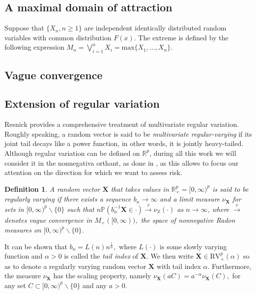 \documentclass[11pt, oneside]{book}
\theoremstyle{plain}
\newtheorem{defn}{Definition}[section]
\theoremstyle{remark}
\begin{document}
\subsection*{A maximal domain of attraction}
Suppose that $\{X_n, n\geq 1\}$ are independent identically distributed random
variables with common distribution $F(x)$. The extreme is defined by the
following expression $M_n = \bigvee_{i=1}^n X_i = \text{max}\{X_1,\dots,X_n\}.$


\subsection*{Vague convergence}

\subsection{Extension of regular variation}
Resnick \cite{resnick2007} provides a comprehensive treatment of multivariate
regular variation. Roughly speaking, a random vector is said to be
\emph{multivariate regular-varying} if its joint tail decays like a power
function, in other words, it is jointly heavy-tailed. Although regular variation
can be defined on $\mathbb{R}^p$, during all this work we will consider it in
the nonnegativa orthant, as done in \cite{cooley-thibaud}, as this allows to
focus our attention on the direction for which we want to assess risk. 
\begin{defn}
    A random vector $\mathbf{X}$ that takes values in $\mathbb{R}^p_+ =
    [0,\infty)^p$ is said to be regularly varying if there exists a sequence
    $b_n\to\infty$ and a limit measure $\nu_\mathbf{X}$ for sets in
    $[0,\infty)^p\backslash\{0\}$ such that
    $n\mathbb{P}(b_n^{-1}\mathbf{X}\in\cdot)\xrightarrow{v}\nu_\mathbb{X}(\cdot)$
    as $n\to\infty$, where $\xrightarrow{v}$ denotes vague convergence in
    $M_+([0,\infty)),$ the space of nonnegative Radon measures on
    $[0,\infty)^p\backslash\{0\}$.
\end{defn}    
It can be shown that $b_n=L(n)n^{\frac{1}{\alpha}},$ where $L(\cdot)$ is some
slowly varying function and $\alpha>0$ is called the \emph{tail index} of
$\mathbf{X}$. We then write $\mathbf{X}\in\text{RV}^p_+(\alpha)$ so as to denote
a regularly varying random vector $\mathbf{X}$ with tail index $\alpha$.
Furthermore, the measure $\nu_\mathbf{X}$ has the scaling property, namely
$\nu_\mathbf{X}(aC) = a^{-\alpha}\nu_\mathbf{X}(C),$ for any set
$C\subset[0,\infty)^p\backslash\{0\}$ and any $a>0$. 
\end{document}
